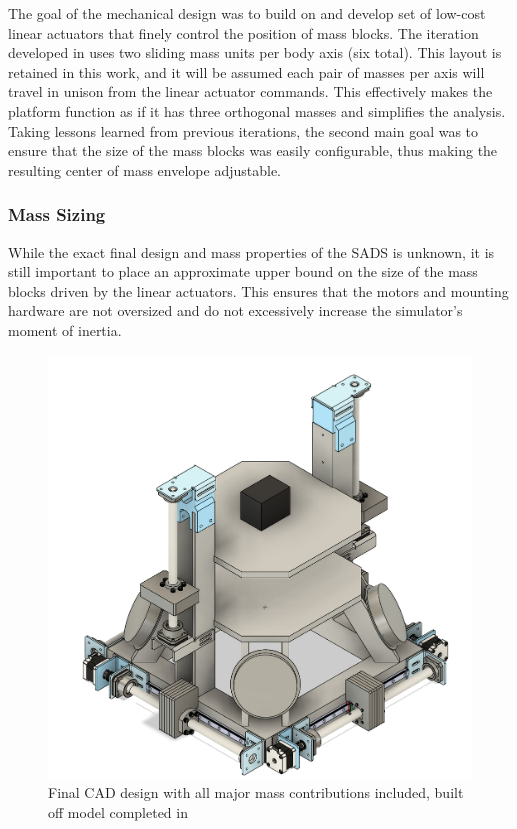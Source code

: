 The goal of the mechanical design was to build on \cite{gilman_automatic_2024} and develop set of low-cost linear actuators that finely control the position of mass blocks. The iteration developed in \cite{gilman_automatic_2024} uses two sliding mass units per body axis (six total). This layout is retained in this work, and it will be assumed each pair of masses per axis will travel in unison from the linear actuator commands. This effectively makes the platform function as if it has three orthogonal masses and simplifies the analysis. Taking lessons learned from previous iterations, the second main goal was to ensure that the size of the mass blocks was easily configurable, thus making the resulting center of mass envelope adjustable. 

\subsubsection{Mass Sizing}

While the exact final design and mass properties of the SADS is unknown, it is still important to place an approximate upper bound on the size of the mass blocks driven by the linear actuators. This ensures that the motors and mounting hardware are not oversized and do not excessively increase the simulator's moment of inertia.

\begin{figure}[h]\label{fig:full_CAD}
    \centering
    \includegraphics[width=0.95\linewidth]{figures/full_CAD.png}
    \caption{Final CAD design with all major mass contributions included, built off model completed in~\cite{gilman_automatic_2024}}
    \label{fig:final_CAD}
\end{figure}


